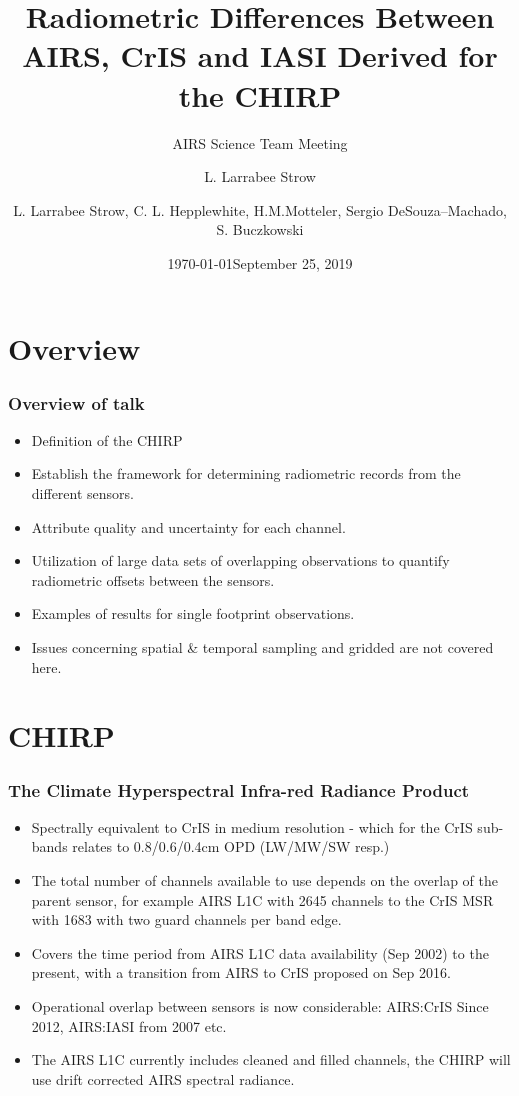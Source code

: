 \documentclass[10pt,t]{beamer}
\author{L. Larrabee Strow}
\date{\today}
\title{\large Radiometric Differences Between \newline
 AIRS, CrIS and IASI Derived for the  \newline
  CHIRP}
\subtitle{\footnotesize{AIRS Science Team Meeting}}
\date{\vspace{0.1in}\footnotesize{September 25, 2019 \vfill}}
\author{L. Larrabee Strow\inst{1,2}, C. L. Hepplewhite\inst{1,2}, H.M.Motteler\inst{1,2}, Sergio DeSouza--Machado\inst{1,2}, S. Buczkowski\inst{1,2}}
\institute[UMBC]{\inst{1} UMBC Physics Dept. \and \inst{2}UMBC JCET}
\begin{document}
\maketitle
{}

\section{Overview}
\begin{frame}
  \frametitle{Overview of talk}
  \begin{itemize}
  \item Definition of the CHIRP
  \item Establish the framework for determining radiometric records from the different sensors.
  \item Attribute quality and uncertainty for each channel.
  \item Utilization of large data sets of overlapping observations to quantify radiometric offsets between the sensors.
  \item Examples of results for single footprint observations.
  \item Issues concerning spatial \& temporal sampling and gridded are not covered here.
    
  \end{itemize}
\end{frame}

\section{CHIRP}
\begin{frame}
  \frametitle{The Climate Hyperspectral Infra-red Radiance Product}
  \begin{itemize}
  \item Spectrally equivalent to CrIS in medium resolution - which for the CrIS sub-bands relates to 0.8/0.6/0.4cm OPD (LW/MW/SW resp.)
  \item The total number of channels available to use depends on the overlap of the parent sensor, for example AIRS L1C with 2645 channels to the CrIS MSR with 1683 with two guard channels per band edge.
  \item Covers the time period from AIRS L1C data availability (Sep 2002) to the present, with a transition from AIRS to CrIS proposed on Sep 2016.
  \item Operational overlap between sensors is now considerable: AIRS:CrIS Since 2012, AIRS:IASI from 2007 etc.
  \item The AIRS L1C currently includes cleaned and filled channels, the CHIRP will use drift corrected AIRS spectral radiance.
    
  \end{itemize}
\end{frame}
\end{document}
